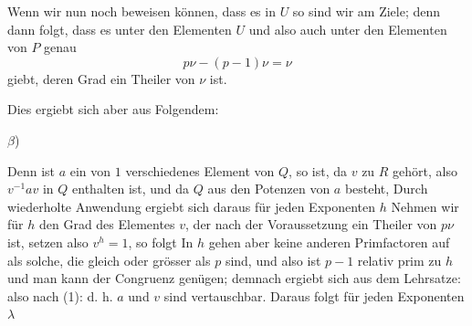 Wenn wir nun noch beweisen können, dass es in $U$  so sind wir am Ziele; denn dann folgt, dass es unter den Elementen $U$ und also auch unter den Elementen von $P$ genau
\[
p\nu - (p-1)\nu = \nu
\]
giebt, deren Grad ein Theiler von $\nu$ ist.

Dies ergiebt sich aber aus Folgendem:

$\beta$) 

Denn ist $a$ ein von $1$ verschiedenes Element von $Q$, so ist, da $v$ zu $R$ gehört, also $v^{-1}av$ in $Q$ enthalten ist, und da $Q$ aus den Potenzen von $a$ besteht,
Durch wiederholte Anwendung ergiebt sich daraus für jeden Exponenten $h$
Nehmen wir für $h$ den Grad des Elementes $v$, der nach der Voraussetzung ein Theiler von $p\nu$ ist, setzen also $v^h = 1$, so folgt
In $h$ gehen aber keine anderen Primfactoren auf als solche, die gleich oder grösser als $p$ sind, und also ist $p-1$ relativ prim zu $h$ und man kann der Congruenz
genügen; demnach ergiebt sich aus dem  Lehrsatze:
also nach (1):
d. h. $a$ und $v$ sind vertauschbar. Daraus folgt für jeden Exponenten $\lambda$
